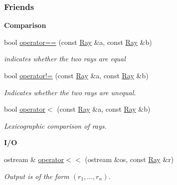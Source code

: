 \subsubsection*{Friends}
\begin{Indent}\textbf{ Comparison}\par
\begin{DoxyCompactItemize}
\item 
bool \hyperlink{group___c_l_s_solvers_a12e1a3322151c1d6bbbce9efeeec40ae}{operator==} (const \hyperlink{group___c_l_s_solvers_class_l_p___solvers_1_1_ray}{Ray} \&a, const \hyperlink{group___c_l_s_solvers_class_l_p___solvers_1_1_ray}{Ray} \&b)
\begin{DoxyCompactList}\small\item\em indicates whether the two rays are equal \end{DoxyCompactList}\item 
bool \hyperlink{group___c_l_s_solvers_a79435f27d182af0ad5dda3646d24ecd8}{operator!=} (const \hyperlink{group___c_l_s_solvers_class_l_p___solvers_1_1_ray}{Ray} \&a, const \hyperlink{group___c_l_s_solvers_class_l_p___solvers_1_1_ray}{Ray} \&b)
\begin{DoxyCompactList}\small\item\em Indicates whether the two rays are unequal. \end{DoxyCompactList}\item 
bool \hyperlink{group___c_l_s_solvers_a4c3d0a1adb5408b59013e6533e144b98}{operator$<$} (const \hyperlink{group___c_l_s_solvers_class_l_p___solvers_1_1_ray}{Ray} \&a, const \hyperlink{group___c_l_s_solvers_class_l_p___solvers_1_1_ray}{Ray} \&b)
\begin{DoxyCompactList}\small\item\em Lexicographic comparison of rays. \end{DoxyCompactList}\end{DoxyCompactItemize}
\end{Indent}
\begin{Indent}\textbf{ I/O}\par
\begin{DoxyCompactItemize}
\item 
ostream \& \hyperlink{group___c_l_s_solvers_a58ab17142b3c74a8d39c1e42dfa7a3f4}{operator$<$$<$} (ostream \&os, const \hyperlink{group___c_l_s_solvers_class_l_p___solvers_1_1_ray}{Ray} \&r)
\begin{DoxyCompactList}\small\item\em Output is of the form $(r_1, \ldots, r_n)$. \end{DoxyCompactList}\end{DoxyCompactItemize}
\end{Indent}


